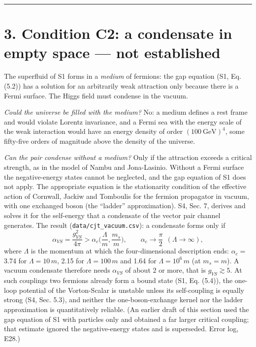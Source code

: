 \documentclass[
  10pt,
]{article}
\begin{document}
\begin{center}\rule{0.5\linewidth}{0.5pt}\end{center}

\hypertarget{condition-c2-a-condensate-in-empty-space-not-established}{%
\section{3. Condition C2: a condensate in empty space --- not
established}\label{condition-c2-a-condensate-in-empty-space-not-established}}

The superfluid of S1 forms in a \emph{medium} of fermions: the gap
equation (S1, Eq. (5.2)) has a solution for an arbitrarily weak
attraction only because there is a Fermi surface. The Higgs field must
condense in the vacuum.

\emph{Could the universe be filled with the medium?} No: a medium
defines a rest frame and would violate Lorentz invariance, and a Fermi
sea with the energy scale of the weak interaction would have an energy
density of order \((100\ \mathrm{GeV})^4\), some fifty-five orders of
magnitude above the density of the universe.

\emph{Can the pair condense without a medium?} Only if the attraction
exceeds a critical strength, as in the model of Nambu and Jona-Lasinio.
Without a Fermi surface the negative-energy states cannot be neglected,
and the gap equation of S1 does not apply. The appropriate equation is
the stationarity condition of the effective action of Cornwall, Jackiw
and Tomboulis for the fermion propagator in vacuum, with one exchanged
boson (the ``ladder'' approximation). S4, Sec. 7, derives and solves it
for the self-energy that a condensate of the vector pair channel
generates. The result (\texttt{data/cjt\_vacuum.csv}): a condensate
forms only if
\[\alpha_{VS}=\frac{g_{VS}^2}{4\pi}>\alpha_c\Big(\frac{\Lambda}{m},\frac{m_s}{m}\Big),\qquad
\alpha_c\to\frac{\pi}{2}\ \ (\Lambda\to\infty),\] where \(\Lambda\) is
the momentum at which the four-dimensional description ends:
\(\alpha_c=\) 3.74 for \(\Lambda=10\,m\), 2.15 for \(\Lambda=100\,m\)
and 1.64 for \(\Lambda=10^6\,m\) (at \(m_s=m\)). A vacuum condensate
therefore needs \(\alpha_{VS}\) of about 2 or more, that is
\(g_{VS}\gtrsim5\). At such couplings two fermions already form a bound
state (S1, Eq. (5.4)), the one-loop potential of the Vorton-Scalar is
unstable unless its self-coupling is equally strong (S4, Sec. 5.3), and
neither the one-boson-exchange kernel nor the ladder approximation is
quantitatively reliable. (An earlier draft of this section used the gap
equation of S1 with particles only and obtained a far larger critical
coupling; that estimate ignored the negative-energy states and is
superseded. Error log, E28.)
\end{document}
